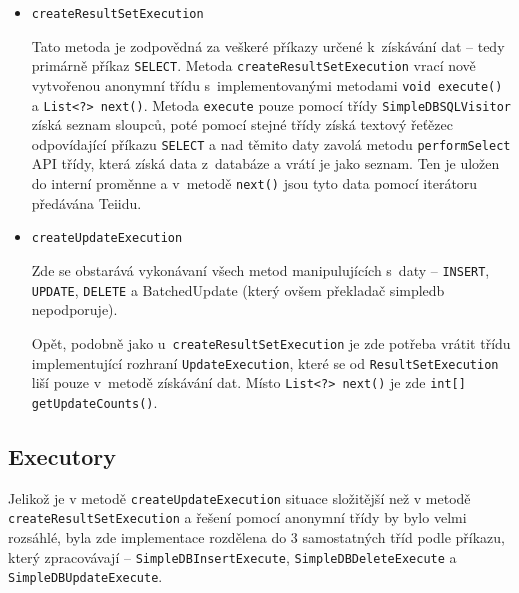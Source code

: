 \documentclass[oneside,12pt,final]{fithesis2}
\begin{document}
\begin{itemize}
 \item \texttt{createResultSetExecution}

Tato metoda je zodpovědná za veškeré příkazy určené k~získávání dat -- tedy primárně příkaz \texttt{SELECT}. Metoda
\texttt{createResultSet\allowbreak Execution} vrací nově vytvořenou anonymní třídu s~implementovanými metodami \texttt{void execute()} a \texttt{List<?> next()}. Metoda \texttt{execute} pouze pomocí třídy \texttt{SimpleDBSQLVisitor} získá seznam sloupců, poté pomocí stejné třídy získá textový řeťězec odpovídající příkazu \texttt{SELECT} a nad těmito daty zavolá metodu \texttt{performSelect} API třídy, která získá data z~databáze a vrátí je jako seznam. Ten je uložen do interní proměnne a v~metodě \texttt{next()} jsou tyto data pomocí iterátoru předávána Teiidu.

\item \texttt{createUpdateExecution}

Zde se obstarává vykonávaní všech metod manipulujících s~daty -- \texttt{INSERT}, \texttt{UPDATE}, \texttt{DELETE} a BatchedUpdate (který ovšem překladač simpledb nepodporuje).

Opět, podobně jako u~\texttt{createResultSetExecution} je zde potřeba vrátit třídu implementující rozhraní \texttt{UpdateExecution}, které se od \texttt{ResultSetExecution} liší pouze v~metodě získávání dat. Místo \texttt{List<?> next()} je zde \texttt{int[] getUpdateCounts()}. 
\end{itemize}
\subsection{Executory}
Jelikož je v metodě \texttt{createUpdateExecution} situace složitější než v metodě \texttt{createResultSetExecution} a řešení pomocí anonymní třídy by bylo velmi rozsáhlé, byla zde implementace rozdělena do 3 samostatných tříd podle příkazu, který zpracovávají -- \texttt{SimpleDBInsertExecute}, \texttt{SimpleDBDeleteExecute} a \texttt{SimpleDBUpdateExecute}.
\end{document}
